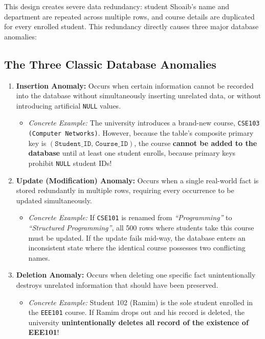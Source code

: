 This design creates severe data redundancy: student Shoaib's name and department are repeated across multiple rows, and course details are duplicated for every enrolled student. This redundancy directly causes three major database anomalies:

\subsection{The Three Classic Database Anomalies}

\begin{enumerate}
\item \textbf{Insertion Anomaly:}
Occurs when certain information cannot be recorded into the database without simultaneously inserting unrelated data, or without introducing artificial \texttt{NULL} values.
\begin{itemize}
\item \textit{Concrete Example:} The university introduces a brand-new course, \texttt{CSE103 (Computer Networks)}. However, because the table's composite primary key is $(\texttt{Student\_ID, Course\_ID})$, the course \textbf{cannot be added to the database} until at least one student enrolls, because primary keys prohibit \texttt{NULL} student IDs!
\end{itemize}

\item \textbf{Update (Modification) Anomaly:}
Occurs when a single real-world fact is stored redundantly in multiple rows, requiring every occurrence to be updated simultaneously.
\begin{itemize}
\item \textit{Concrete Example:} If \texttt{CSE101} is renamed from \textit{``Programming''} to \textit{``Structured Programming''}, all 500 rows where students take this course must be updated. If the update fails mid-way, the database enters an inconsistent state where the identical course possesses two conflicting names.
\end{itemize}

\item \textbf{Deletion Anomaly:}
Occurs when deleting one specific fact unintentionally destroys unrelated information that should have been preserved.
\begin{itemize}
\item \textit{Concrete Example:} Student 102 (Ramim) is the sole student enrolled in the \texttt{EEE101} course. If Ramim drops out and his record is deleted, the university \textbf{unintentionally deletes all record of the existence of EEE101}!
\end{itemize}
\end{enumerate}


